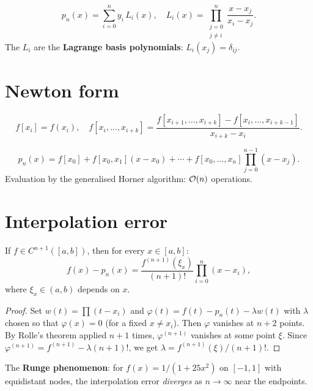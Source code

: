 \begin{definition}
\[
p_n(x) = \sum_{i=0}^n y_i\,L_i(x), \quad L_i(x)=\prod_{\substack{j=0\\j\neq i}}^n\frac{x-x_j}{x_i-x_j}.
\]
The $L_i$ are the \textbf{Lagrange basis polynomials}: $L_i(x_j)=\delta_{ij}$.
\end{definition}

\section{Newton form}

\begin{definition}
\[
f[x_i]=f(x_i), \quad f[x_i,\ldots,x_{i+k}]=\frac{f[x_{i+1},\ldots,x_{i+k}]-f[x_i,\ldots,x_{i+k-1}]}{x_{i+k}-x_i}.
\]
\end{definition}

\begin{definition}
\[
p_n(x) = f[x_0]+f[x_0,x_1](x-x_0)+\cdots+f[x_0,\ldots,x_n]\prod_{j=0}^{n-1}(x-x_j).
\]
Evaluation by the generalised Horner algorithm: $\mathcal{O}(n)$ operations.
\end{definition}

\section{Interpolation error}

\begin{theorem}\label{thm:interp-error}
If $f\in C^{n+1}([a,b])$, then for every $x\in[a,b]$:
\[
f(x)-p_n(x) = \frac{f^{(n+1)}(\xi_x)}{(n+1)!}\prod_{i=0}^n(x-x_i),
\]
where $\xi_x\in(a,b)$ depends on $x$.
\end{theorem}

\begin{proof}
Set $w(t)=\prod(t-x_i)$ and $\varphi(t)=f(t)-p_n(t)-\lambda w(t)$ with $\lambda$ chosen so that $\varphi(x)=0$ (for a fixed $x\neq x_i$). Then $\varphi$ vanishes at $n+2$ points. By Rolle's theorem applied $n+1$ times, $\varphi^{(n+1)}$ vanishes at some point $\xi$. Since $\varphi^{(n+1)}=f^{(n+1)}-\lambda(n+1)!$, we get $\lambda=f^{(n+1)}(\xi)/(n+1)!$.
\end{proof}

\begin{warning}
The \textbf{Runge phenomenon}: for $f(x)=1/(1+25x^2)$ on $[-1,1]$ with equidistant nodes, the interpolation error \emph{diverges} as $n\to\infty$ near the endpoints.
\end{warning}

